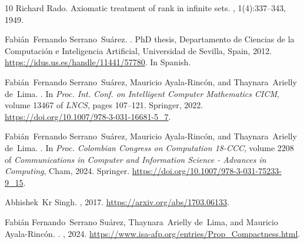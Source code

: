 \documentclass[11pt,a4paper]{article}
\begin{document}
\begin{thebibliography}{10}
Richard Rado.
\newblock Axiomatic treatment of rank in infinite sets.
, 1(4):337--343, 1949.

Fabi{\'a}n~Fernando Serrano~Su{\'a}rez.
.
\newblock PhD thesis, Departamento de Ciencias de la Computación e Inteligencia Artificial, Universidad de Sevilla, Spain, 2012.
\newblock \url{https://idus.us.es/handle/11441/57780}. In Spanish.

Fabi{\'a}n~Fernando Serrano~Su{\'a}rez, Mauricio Ayala-Rinc{\'o}n, and Thaynara~Arielly de~Lima.
.
\newblock In {\em Proc. Int. Conf. on Intelligent Computer Mathematics {CICM}}, volume 13467 of {\em LNCS}, pages 107--121. Springer, 2022.
\newblock \url{https://doi.org/10.1007/978-3-031-16681-5_7}.

Fabi{\'a}n~Fernando Serrano~Su{\'a}rez, Mauricio Ayala-Rinc{\'o}n, and Thaynara~Arielly de~Lima.
.
\newblock In {\em Proc. Colombian Congress on Computation {18-CCC}}, volume 2208 of {\em Communications in Computer and Information Science - Advances in Computing}, Cham, 2024. Springer.
\newblock \url{https://doi.org/10.1007/978-3-031-75233-9_15}.

Abhishek~Kr Singh.
, 2017.
\newblock \url{https://arxiv.org/abs/1703.06133}.

Fabi{\'{a}}n Fernando~Serrano Su{\'{a}}rez, Thaynara~Arielly de~Lima, and Mauricio Ayala{-}Rinc{\'{o}}n.
.
, 2024.
\newblock \url{https://www.isa-afp.org/entries/Prop\_Compactness.html}.

\end{thebibliography}


%
\end{document}

